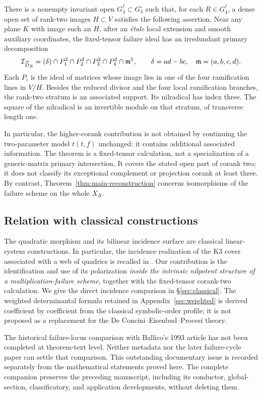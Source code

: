 \begin{theorem}\label{thm:main-coranktwo}
There is a nonempty invariant open $G_4^\dagger\subset G_4^\circ$
such that, for each $R\in G_4^\dagger$, a dense open set of
rank-two images $H\subset V$ satisfies the following assertion.
Near any plane $K$ with image such an $H$, after an \emph{\'etale}
local extension and smooth auxiliary coordinates, the fixed-tensor
failure ideal has an irredundant primary decomposition
\begin{equation}\label{eq:main-coranktwo}
 \mathcal I_{\widehat D_R}
   =(\delta)\cap P_1^2\cap P_2^2\cap P_3^2\cap P_4^2\cap\mathfrak m^5,
 \qquad \delta=ad-bc,\quad\mathfrak m=(a,b,c,d).
\end{equation}
Each $P_i$ is the ideal of matrices whose image lies in one of the four
ramification lines in $V/H$. Besides the reduced divisor and the four
local ramification branches, the rank-two stratum is an associated
support. Its nilradical has index three. The square of the nilradical
is an invertible module on that stratum, of transverse length one.
\end{theorem}

In particular, the higher-corank contribution is not obtained by
continuing the two-parameter model $t(t,f)$ unchanged: it contains
additional associated information. The theorem is a fixed-tensor
calculation, not a specialization of a generic-matrix primary
intersection. It covers the stated open part of corank two; it does
not classify its exceptional complement or projection corank at least
three. By contrast, Theorem~\ref{thm:main-reconstruction} concerns
isomorphisms of the failure scheme on the whole $X_R$.

\subsection*{Relation with classical constructions}
The quadratic morphism and its bilinear incidence surface are classical
linear-system constructions. In particular, the incidence realization
of the K3 cover associated with a web of quadrics is recalled in
\cite[\S4]{IK}. Our contribution is the identification and use of its
polarization \emph{inside the intrinsic nilpotent structure of a
multiplication-failure scheme}, together with the fixed-tensor
corank-two calculation. We give the direct incidence comparison in
\S\ref{sec:classical}. The weighted determinantal formula retained in
Appendix~\ref{sec:weighted} is derived coefficient by coefficient from
the classical symbolic-order profile; it is not proposed as a replacement
for the De Concini--Eisenbud--Procesi theory.

The historical failure-locus comparison with Ballico's 1993 article
\cite{Ballico93} has not been completed at theorem-text level. Neither
metadata nor the later failure-cycle paper can settle that comparison.
This outstanding documentary issue is recorded separately from the
mathematical statements proved here. The complete companion preserves
the preceding manuscript, including its conductor, global-section,
classificatory, and application developments, without deleting them.
